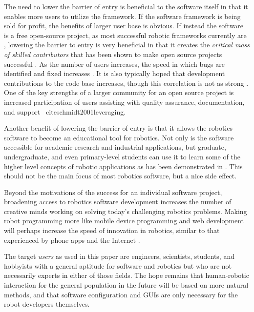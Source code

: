 \documentclass[10pt,journal,compsoc]{joser1}
\begin{document}
{The need to lower the barrier of entry is beneficial to the software itself in that it enables more users to utilize the framework. If the software framework is being sold for profit, the benefits of larger user base is obvious. If instead the software is a free open-source project, as most successful robotic frameworks currently are \cite{makarenko2007benefits}, lowering the barrier to entry is very beneficial in that it creates the \textit{critical mass of skilled contributors} that has been shown to make open source projects successful \cite{bruyninckx2001open}. As the number of users increases, the speed in which bugs are identified and fixed increases \cite{schmidt1999software}. It is also typically hoped that development contributions to the code base increases, though this correlation is not as strong \cite{schmidt1999software}. One of the key strengths of a larger community for an open source project is increased participation of users assisting with quality assurance, documentation, and support \
cite{schmidt2001leveraging}.

Another benefit of lowering the barrier of entry is that it allows the robotics software to become an educational tool for robotics. Not only is the software accessible for academic research and industrial applications, but graduate, undergraduate, and even primary-level students can use it to learn some of the higher level concepts of robotic applications as has been demonstrated in \cite{correll2013one, moll2011teaching, guyot2011teaching}. This should not be the main focus of most robotics software, but a nice side effect.

Beyond the motivations of the success for an individual software project, broadening access to robotics software development increases the number of creative minds working on solving today's challenging robotics problems. Making robot programming more like mobile device programming and web development will perhaps increase the speed of innovation in robotics, similar to that experienced by phone apps and the Internet \cite{boudreau2012let}.

The target \textit{users} as used in this paper are engineers, scientists, students, and hobbyists with a general aptitude for software and robotics but who are not necessarily experts in either of those fields. The hope remains that human-robotic interaction for the general population in the future will be based on more natural methods, and that software configuration and GUIs are only necessary for the robot developers themselves.

}
\end{document}
